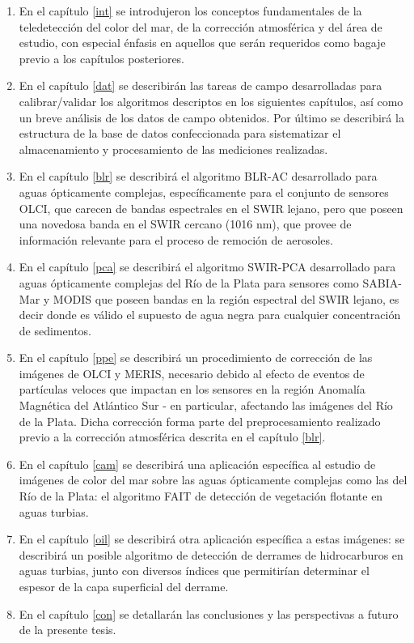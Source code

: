     \begin{enumerate}
        \item En el capítulo \ref{int} se introdujeron los conceptos fundamentales de la teledetección del color del mar, de la corrección atmosférica y del área de estudio, con especial énfasis en aquellos que serán requeridos como bagaje previo a los capítulos posteriores.
        \item En el capítulo \ref{dat} se describirán las tareas de campo desarrolladas para calibrar/validar los algoritmos descriptos en los siguientes capítulos, así como un breve análisis de los datos de campo obtenidos. Por último se describirá la estructura de la base de datos confeccionada para sistematizar el almacenamiento y procesamiento de las mediciones realizadas.
        \item En el capítulo \ref{blr} se describirá el algoritmo BLR-AC desarrollado para aguas ópticamente complejas, específicamente para el conjunto de sensores OLCI, que carecen de bandas espectrales en el SWIR lejano, pero que poseen una novedosa banda en el SWIR cercano (1016 nm), que provee de información relevante para el proceso de remoción de aerosoles.
        \item En el capítulo \ref{pca} se describirá el algoritmo SWIR-PCA desarrollado para aguas ópticamente complejas del Río de la Plata para sensores como SABIA-Mar y MODIS que poseen bandas en la región espectral del SWIR lejano, es decir donde es válido el supuesto de agua negra para cualquier concentración de sedimentos.
        \item En el capítulo \ref{ppe} se describirá un procedimiento de corrección de las imágenes de OLCI y MERIS, necesario debido al efecto de eventos de partículas veloces que impactan en los sensores en la región Anomalía Magnética del Atlántico Sur - en particular, afectando las imágenes del Río de la Plata. Dicha corrección forma parte del preprocesamiento realizado previo a la corrección atmosférica descrita en el capítulo \ref{blr}.
        \item En el capítulo \ref{cam} se describirá una aplicación específica al estudio de imágenes de color del mar sobre las aguas ópticamente complejas como las del Río de la Plata: el algoritmo FAIT de detección de vegetación flotante en aguas turbias.
        \item En el capítulo \ref{oil} se describirá otra aplicación específica a estas imágenes: se describirá un posible algoritmo de detección de derrames de hidrocarburos en aguas turbias, junto con diversos índices que permitirían determinar el espesor de la capa superficial del derrame.
        \item En el capítulo \ref{con} se detallarán las conclusiones y las perspectivas a futuro de la presente tesis.
    \end{enumerate}